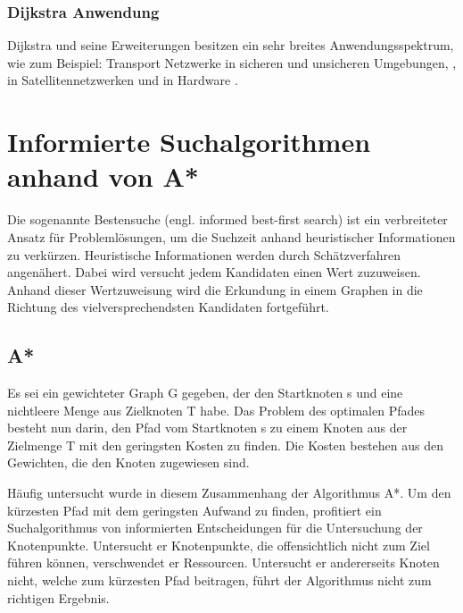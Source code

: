 \subsubsection{Dijkstra Anwendung}

Dijkstra und seine Erweiterungen besitzen ein sehr breites Anwendungsspektrum, wie zum Beispiel: Transport Netzwerke in sicheren und unsicheren Umgebungen, \cite{fuzzyDijk} \cite{publicTrans2}, in Satellitennetzwerken \cite{satelite} und in Hardware \cite{hardware}. 

\section{Informierte Suchalgorithmen anhand von A*}

Die sogenannte Bestensuche (engl. informed best-first search) ist ein verbreiteter Ansatz für Problemlösungen, um die Suchzeit anhand heuristischer Informationen zu verkürzen. Heuristische Informationen werden durch Schätzverfahren angenähert. Dabei wird versucht jedem Kandidaten einen Wert zuzuweisen. Anhand dieser Wertzuweisung wird die Erkundung in einem Graphen in die Richtung des vielversprechendsten Kandidaten fortgeführt.

\subsection{A*} 

Es sei ein gewichteter Graph G gegeben, der den Startknoten s und eine nichtleere Menge aus Zielknoten T habe. Das Problem des optimalen Pfades besteht nun darin, den Pfad vom Startknoten s zu einem Knoten aus der Zielmenge T mit den geringsten Kosten zu finden. Die Kosten bestehen aus den Gewichten, die den Knoten zugewiesen sind\cite{RinaDechterandJudeaPearl.1983}.

Häufig untersucht wurde in diesem Zusammenhang der Algorithmus A*. Um den kürzesten Pfad mit dem geringsten Aufwand zu finden, profitiert ein Suchalgorithmus von informierten Entscheidungen für die Untersuchung der Knotenpunkte. Untersucht er Knotenpunkte, die offensichtlich nicht zum Ziel führen können, verschwendet er Ressourcen. Untersucht er andererseits Knoten nicht, welche zum kürzesten Pfad beitragen, führt der Algorithmus nicht zum richtigen Ergebnis.


